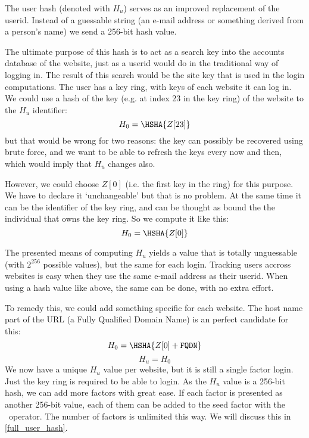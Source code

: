 \label{initial_user_hash}
The user hash (denoted with \(H_u\)) serves as an improved replacement of the userid.
Instead of a guessable string
(an e-mail address or something derived from a person's name)
we send a 256-bit hash value.
\par
The ultimate purpose of this hash is to act as a search key into the accounts database of the website,
just as a userid would do in the traditional way of logging in.
The result of this search would be the site key that is used in the login computations.
The user has a key ring, with keys of each website it can log in.
We could use a hash of the key
(e.g. at index 23 in the key ring)
of the website to the \(H_u\) identifier:
\[H_0 = \HSHA{Z[23]}\]
but that would be wrong for two reasons:
the key can possibly be recovered using brute force,
and we want to be able to refresh the keys every now and then, which would imply that \(H_u\) changes also.
\par
However, we could choose \(Z[0]\)
(i.e. the first key in the ring)
for this purpose.
We have to declare it `unchangeable' but that is no problem.
At the same time it can be the identifier of the key ring, and can be thought as bound the the individual that owns the key ring.
So we compute it like this:
\[H_0 = \HSHA{Z[0]}\]
\par
The presented means of computing \(H_u\) yields a value that is totally unguessable (with \(2^{256}\) possible values), but the same for each login.
Tracking users accross websites is easy when they use the same e-mail address as their userid.
When using a hash value like above, the same can be done, with no extra effort.
\par
To remedy this, we could add something specific for each website.
The host name part of the URL
(a Fully Qualified Domain Name)
is an perfect candidate for this:
\begin{equation}
H_0 = \HSHA{Z[0] + \mathtt{FQDN}}
\end{equation}
\begin{equation}
H_u = H_0
\end{equation}
We now have a unique \(H_u\) value per website, but it is still a single factor login.
Just the key ring is required to be able to login.
As the \(H_u\) value is a 256-bit hash, we can add more factors with great ease.
If each factor is presented as another 256-bit value, each of them can be added to the seed factor with the \XOR\ operator.
The number of factors is unlimited this way.
We will discuss this in \ref{full_user_hash}.

